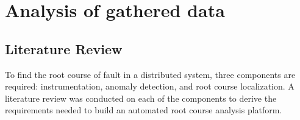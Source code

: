 \section{Analysis of gathered data}

\subsection{Literature Review}

To find the root course of fault in a distributed system, three components are required: instrumentation, anomaly detection, and root course localization. A literature review was conducted on each of the components to derive the requirements needed to build an automated root course analysis platform.


